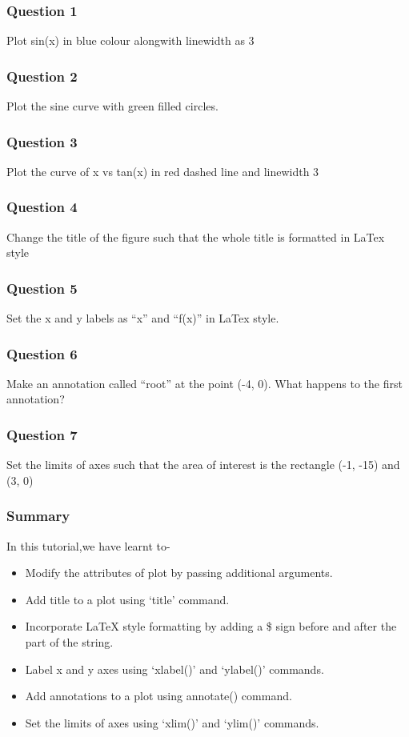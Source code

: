 \documentclass[presentation]{beamer}
\begin{document}
\begin{frame}
\frametitle{Question 1}
\label{sec-4}

  Plot sin(x) in blue colour alongwith linewidth as 3
\end{frame}
\begin{frame}
\frametitle{Question 2}
\label{sec-5}

  Plot the sine curve with green filled circles.
\end{frame}
\begin{frame}
\frametitle{Question 3}
\label{sec-6}

  Plot the curve of x vs tan(x) in red dashed line and linewidth 3
\end{frame}
\begin{frame}
\frametitle{Question 4}
\label{sec-7}

  Change the title of the figure such that the whole title is
  formatted in LaTex style
\end{frame}
\begin{frame}
\frametitle{Question 5}
\label{sec-8}

  Set the x and y labels as ``x'' and ``f(x)'' in LaTex style.
\end{frame}
\begin{frame}
\frametitle{Question 6}
\label{sec-9}

  Make an annotation called ``root'' at the point (-4, 0). What happens
  to the first annotation?
\end{frame}
\begin{frame}
\frametitle{Question 7}
\label{sec-10}

  Set the limits of axes such that the area of interest is the
  rectangle (-1, -15) and (3, 0)
\end{frame}
\begin{frame}
\frametitle{Summary}
\label{sec-11}

  In this tutorial,we have learnt to-

\begin{itemize}
\item Modify the attributes of plot by passing additional arguments.
\item Add title to a plot using `title' command.
\item Incorporate \LaTeX{} style formatting by adding a \$ sign before and after the part of the string.
\item Label x and y axes using `xlabel()' and `ylabel()' commands.
\item Add annotations to a plot using annotate() command.
\item Set the limits of axes using `xlim()' and `ylim()' commands.
\end{itemize}
\end{frame}
\end{document}
